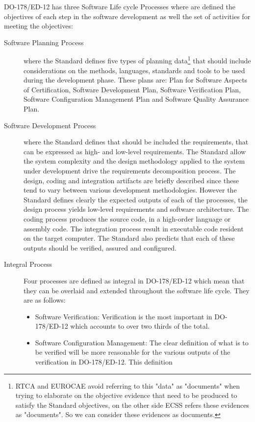 {DO-178/ED-12 has three Software Life cycle Processes where are defined the objectives of each step in the software development as well
the set of activities for meeting the objectives:
\begin{description}
\item[Software Planning Process] where the Standard defines five types of planning data\footnote{\ac{RTCA} and \ac{EUROCAE} avoid referring to this "data" as
"documents" when trying to elaborate on the objective evidence that need to be produced to satisfy the Standard objectives\cite{avionics}, on the other side \ac{ECSS} refers
these evidences as "documents". So we can consider these evidences as documents.} that should include
considerations on the methods, languages, standards and tools to be used during the development phase. These plans are: Plan for Software Aspects of Certification,
Software Development Plan, Software Verification Plan, Software Configuration Management Plan and Software Quality Assurance Plan.
\item[Software Development Process] where the Standard defines that should be included the requirements, that can be
expressed as high- and low-level requirements\cite{avionics,ed-12b}. The Standard allow the system complexity and the design methodology applied to the system under development
drive the requirements decomposition process. The design, coding and integration artifacts are briefly described since these tend to vary between various development methodologies.
However the Standard defines clearly the expected outputs of each of the processes, the design process yields low-level requirements and software architecture.
The coding process produces the source code, in a high-order language or assembly code. The integration process result in executable code
resident on the target computer. The Standard also predicts that each of these outputs should be verified, assured and configured.
\item[Integral Process] Four processes are defined as integral in DO-178/ED-12 which
mean that they can be overlaid and extended throughout the
software life cycle. They are as follows:
\begin{itemize}
\item Software Verification: Verification is the most important
in DO-178/ED-12 which accounts to over two thirds of the total.
\item Software Configuration Management: The clear definition
of what is to be verified will be more reasonable for the
various outputs of the verification in DO-178/ED-12. This definition

\end{itemize}
\end{description}}
